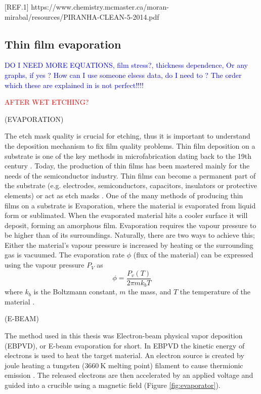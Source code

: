 \documentclass[final]{jyflluk}
\begin{document}
[REF.1] https://www.chemistry.mcmaster.ca/moran-mirabal/resources/PIRANHA-CLEAN-5-2014.pdf








\subsection{Thin film evaporation}
\label{sec:xx2}

\textcolor{blue}{DO I NEED MORE EQUATIONS, film stress?, thickness dependence, Or any graphs, if yes ? How can I use someone elsess data, do I need to ? The order which these are explained in is not perfect!!!!}

\textcolor{red}{AFTER WET ETCHING?}

(EVAPORATION)

The etch mask quality is crucial for etching, thus it is important to understand the deposition mechanism to fix film quality problems. Thin film deposition on a substrate is one of the key methods in microfabrication dating back to the 19th century \cite{ohring1992materials}.  Today, the production of thin films has been mastered mainly for the needs of the semiconductor industry. Thin films can become a permanent part of the substrate (e.g. electrodes, semiconductors, capacitors, insulators or protective elements) or act as etch masks \cite{franssila2010introduction}. One of the many methods of producing thin films on a substrate is Evaporation, where the material is evaporated from liquid form or sublimated. When the evaporated material hits a cooler surface it will deposit, forming an amorphous film. Evaporation requires the vapour pressure to be higher than of its surroundings. Naturally, there are two ways to achieve this; Either the material’s vapour pressure is increased by heating or the surrounding gas is vacuumed. The evaporation rate $\phi$ (flux of the material) can be expressed using the vapour pressure $P_V$ as 
%
\begin{equation}
    \label{eq:fluxx}
    \phi = \frac{P_v (T)}{2 \pi m k_b T}
 \end{equation}
where $k_b$ is the Boltzmann constant, $m$ the mass, and $T$ the temperature of the material \cite{franssila2010introduction}.

(E-BEAM)

The method used in this thesis was Electron-beam physical vapor deposition (EBPVD), or E-beam evaporation for short. In EBPVD the kinetic energy of electrons is used to heat the target material. An electron source is created by joule heating a tungsten ($\SI{3660}{\kelvin}$ melting point) filament to cause thermionic emission \cite{franssila2010introduction}. The released electrons are then accelerated by an applied voltage and guided into a crucible using a magnetic field (Figure \ref{fig:evaporator}). 
\end{document}

